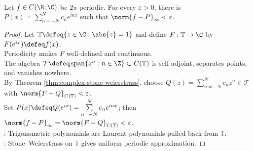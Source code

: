 \begin{corollary} \label{cor:trigonometric-polynomial-weierstrass} \\
Let $f\in C(\R;\C)$ be $2\pi$-periodic. For every $\varepsilon>0$, there is $P(x)=\sum\limits_{n=-N}^{N}c_ne^{inx}$ such that $\norm{f-P}_\infty<\varepsilon$.
\begin{proof}
Let $\mathbb{T}\defeq\{z\in\C:\abs{z}=1\}$ and define $F:\mathbb{T}\to\C$ by $F(e^{ix})\defeq f(x)$.\\
Periodicity makes $F$ well-defined and continuous.\\
The algebra $\mathcal{T}\defeq\operatorname{span}\{z^n:n\in\Z\}\subset C(\mathbb{T})$ is self-adjoint, separates points, and vanishes nowhere.\\
By Theorem \ref{thm:complex-stone-weierstrass}, choose $Q(z)=\sum\limits_{n=-N}^{N}c_nz^n\in\mathcal{T}$ with $\norm{F-Q}_{C(\mathbb{T})}<\varepsilon$.\\
Set $P(x)\defeq Q(e^{ix})=\sum\limits_{n=-N}^{N}c_ne^{inx}$; then $\norm{f-P}_\infty=\norm{F-Q}_{C(\mathbb{T})}<\varepsilon$.\\
: Trigonometric polynomials are Laurent polynomials pulled back from $\mathbb{T}$.\\
: Stone--Weierstrass on $\mathbb{T}$ gives uniform periodic approximation.
\end{proof}
\end{corollary}

